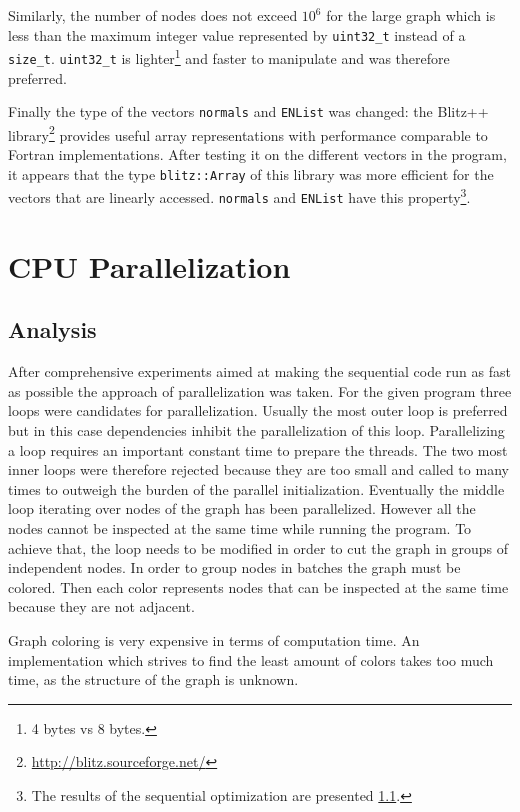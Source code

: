 \documentclass[fleqn,11pt]{SelfArx} %
\theoremstyle{definition}
\begin{document}
Similarly, the number of nodes does not exceed $10^6$ for the large graph which is less than the maximum integer value represented by \verb+uint32_t+ instead of a \verb+size_t+. \verb+uint32_t+ is lighter\footnote{4 bytes vs 8 bytes.} and faster to manipulate and was therefore preferred.

Finally the type of the vectors \verb+normals+ and \verb+ENList+ was changed: the {Blitz++ library}\footnote{\url{http://blitz.sourceforge.net/}} provides useful array representations with performance comparable to Fortran implementations. After testing it on the different vectors in the program, it appears that the type \verb+blitz::Array+ of this library was more efficient for the vectors that are linearly accessed. \verb+normals+ and \verb+ENList+ have this property\footnote{The results of the sequential optimization are presented \ref{}.}.


\section{CPU Parallelization}

\subsection{Analysis}

After comprehensive experiments aimed at making the sequential code run as fast as possible the approach of parallelization was taken. For the given program three loops were candidates for parallelization. Usually the most outer loop is preferred but in this case dependencies inhibit the parallelization of this loop. Parallelizing a loop requires an important constant time to prepare the threads. The two most inner loops were therefore rejected because they are too small and called to many times to outweigh the burden of the parallel initialization. Eventually the middle loop iterating over nodes of the graph has been parallelized. However all the nodes cannot be inspected at the same time while running the program. To achieve that, the loop needs to be modified in order to cut the graph in groups of independent nodes. In order to group nodes in batches the graph must be colored. Then each color represents nodes that can be inspected at the same time because they are not adjacent.

Graph coloring is very expensive in terms of computation time. An implementation which strives to find the least amount of colors takes too much time, as the structure of the graph is unknown.
\end{document}

